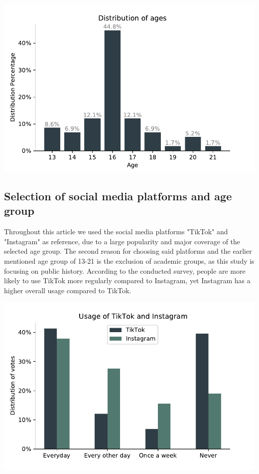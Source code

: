 \documentclass{article}
\begin{document}

\begin{center}

\includegraphics[scale = 0.75]{AgeGraph.pdf}

\end{center}

\subsection{Selection of social media platforms and age group}
Throughout this article we used the social media platforms "TikTok" and "Instagram" as reference, due to a large popularity and major coverage of the selected age group. The second reason for choosing said platforms and the earlier mentioned age group of 13-21 is the exclusion of academic groups, as this study is focusing on public history. According to the conducted survey, people are more likely to use TikTok more regularly compared to Instagram, yet Instagram has a higher overall usage compared to TikTok. 

\begin{center}

\includegraphics[scale = 0.65]{Usage.pdf}

\end{center}
\end{document}
